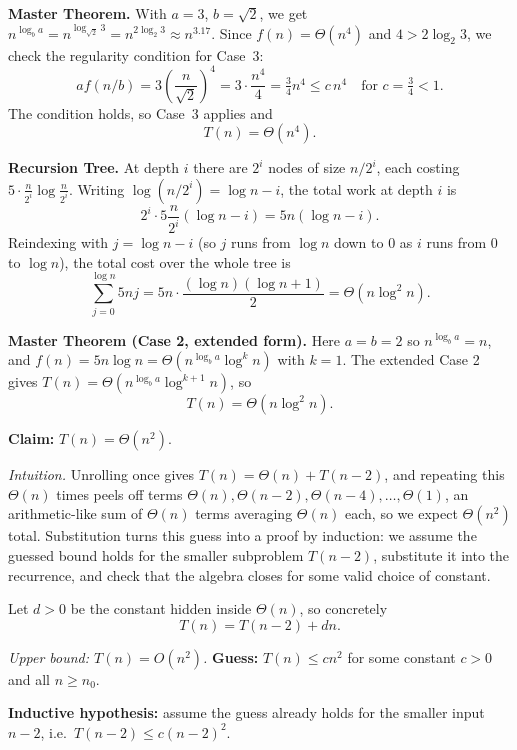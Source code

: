 \documentclass[12pt,twoside]{article}
\begin{document}
\begin{problems}
\begin{problemparts}
\textbf{Master Theorem.}
With $a = 3$, $b = \sqrt2$, we get $n^{\log_b a} = n^{\log_{\sqrt2} 3} = n^{2\log_2 3} \approx n^{3.17}$.
Since $f(n) = \Theta(n^4)$ and $4 > 2\log_2 3$, we check the regularity condition for Case~3:
\[
  a f(n/b) = 3\left(\frac{n}{\sqrt2}\right)^4 = 3\cdot\frac{n^4}{4} = \tfrac{3}{4}n^4 \le c\, n^4
  \quad \text{for } c = \tfrac{3}{4} < 1.
\]
The condition holds, so Case~3 applies and
\[
  \boxed{T(n) = \Theta(n^4).}
\]

\problempart

\textbf{Recursion Tree.}
At depth $i$ there are $2^i$ nodes of size $n/2^i$, each costing $5 \cdot \frac{n}{2^i}\log\frac{n}{2^i}$.
Writing $\log(n/2^i) = \log n - i$, the total work at depth $i$ is
\[
  2^i \cdot 5\frac{n}{2^i}(\log n - i) = 5n(\log n - i).
\]
Reindexing with $j = \log n - i$ (so $j$ runs from $\log n$ down to $0$ as $i$ runs from $0$ to
$\log n$), the total cost over the whole tree is
\[
  \sum_{j=0}^{\log n} 5nj = 5n \cdot \frac{(\log n)(\log n+1)}{2} = \Theta(n\log^2 n).
\]

\textbf{Master Theorem (Case 2, extended form).}
Here $a=b=2$ so $n^{\log_b a} = n$, and $f(n) = 5n\log n = \Theta(n^{\log_b a}\log^k n)$ with
$k=1$. The extended Case 2 gives $T(n) = \Theta(n^{\log_b a}\log^{k+1} n)$, so
\[
  \boxed{T(n) = \Theta(n\log^2 n).}
\]

\problempart

\textbf{Claim:} $T(n) = \Theta(n^2)$.

\textit{Intuition.} Unrolling once gives $T(n) = \Theta(n) + T(n-2)$, and repeating this
$\Theta(n)$ times peels off terms $\Theta(n), \Theta(n-2), \Theta(n-4), \dots, \Theta(1)$, an
arithmetic-like sum of $\Theta(n)$ terms averaging $\Theta(n)$ each, so we expect $\Theta(n^2)$
total. Substitution turns this guess into a proof by induction: we assume the guessed bound holds
for the smaller subproblem $T(n-2)$, substitute it into the recurrence, and check that the
algebra closes for some valid choice of constant.

Let $d>0$ be the constant hidden inside $\Theta(n)$, so concretely
\[
  T(n) = T(n-2) + dn.
\]

\textit{Upper bound: $T(n) = O(n^2)$.}
\textbf{Guess:} $T(n) \le cn^2$ for some constant $c>0$ and all $n \ge n_0$.

\textbf{Inductive hypothesis:} assume the guess already holds for the smaller input $n-2$, i.e.\
$T(n-2) \le c(n-2)^2$.


\end{problemparts}
\end{problems}
\end{document}
